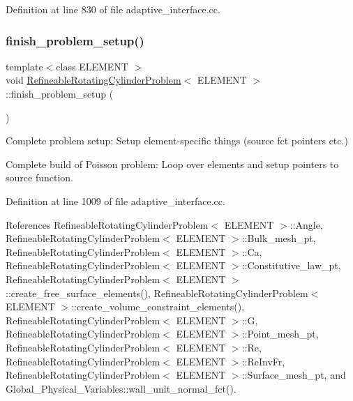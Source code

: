 Definition at line 830 of file adaptive\+\_\+interface.\+cc.

\mbox{\label{classRefineableRotatingCylinderProblem_a417d18c2584ed1ea38daefe5dd68b4a4}} 
\subsubsection{\texorpdfstring{finish\+\_\+problem\+\_\+setup()}{finish\_problem\_setup()}}
{\footnotesize\ttfamily template$<$class E\+L\+E\+M\+E\+NT $>$ \\
void \hyperlink{classRefineableRotatingCylinderProblem}{Refineable\+Rotating\+Cylinder\+Problem}$<$ E\+L\+E\+M\+E\+NT $>$\+::finish\+\_\+problem\+\_\+setup (\begin{DoxyParamCaption}{ }\end{DoxyParamCaption})}



Complete problem setup\+: Setup element-\/specific things (source fct pointers etc.) 

Complete build of Poisson problem\+: Loop over elements and setup pointers to source function. 

Definition at line 1009 of file adaptive\+\_\+interface.\+cc.



References Refineable\+Rotating\+Cylinder\+Problem$<$ E\+L\+E\+M\+E\+N\+T $>$\+::\+Angle, Refineable\+Rotating\+Cylinder\+Problem$<$ E\+L\+E\+M\+E\+N\+T $>$\+::\+Bulk\+\_\+mesh\+\_\+pt, Refineable\+Rotating\+Cylinder\+Problem$<$ E\+L\+E\+M\+E\+N\+T $>$\+::\+Ca, Refineable\+Rotating\+Cylinder\+Problem$<$ E\+L\+E\+M\+E\+N\+T $>$\+::\+Constitutive\+\_\+law\+\_\+pt, Refineable\+Rotating\+Cylinder\+Problem$<$ E\+L\+E\+M\+E\+N\+T $>$\+::create\+\_\+free\+\_\+surface\+\_\+elements(), Refineable\+Rotating\+Cylinder\+Problem$<$ E\+L\+E\+M\+E\+N\+T $>$\+::create\+\_\+volume\+\_\+constraint\+\_\+elements(), Refineable\+Rotating\+Cylinder\+Problem$<$ E\+L\+E\+M\+E\+N\+T $>$\+::G, Refineable\+Rotating\+Cylinder\+Problem$<$ E\+L\+E\+M\+E\+N\+T $>$\+::\+Point\+\_\+mesh\+\_\+pt, Refineable\+Rotating\+Cylinder\+Problem$<$ E\+L\+E\+M\+E\+N\+T $>$\+::\+Re, Refineable\+Rotating\+Cylinder\+Problem$<$ E\+L\+E\+M\+E\+N\+T $>$\+::\+Re\+Inv\+Fr, Refineable\+Rotating\+Cylinder\+Problem$<$ E\+L\+E\+M\+E\+N\+T $>$\+::\+Surface\+\_\+mesh\+\_\+pt, and Global\+\_\+\+Physical\+\_\+\+Variables\+::wall\+\_\+unit\+\_\+normal\+\_\+fct().



